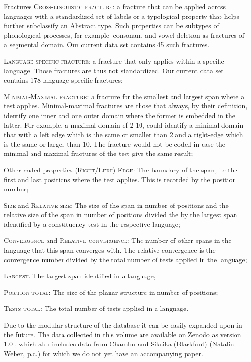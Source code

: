 \documentclass[output=paper,draftmode]{langscibook}
\begin{document}
\ea Fractures
    \ea \textsc{Cross-linguistic fracture}: a fracture that can be applied across languages with a standardized set of labels or a typological property that helps further subclassify an Abstract type. Such properties can be subtypes of phonological processes, for example, consonant and vowel deletion as fractures of a segmental domain. Our current data set contains 45 such fractures.

    \ex \textsc{Language-specific fracture}: a fracture that only applies within a specific language. Those fractures are thus not standardized. Our current data set contains 178 language-specific fractures;

    \ex \textsc{Minimal-Maximal fracture}: a fracture for the smallest and largest span where a test applies. Minimal-maximal fractures are those that always, by their definition, identify one inner and one outer domain where the former is embedded in the latter. For example, a maximal domain of 2-10, could identify a minimal domain that with a left edge which is the same or smaller than 2 and a right-edge which is the same or larger than 10. The fracture would not be coded in case the minimal and maximal fractures of the test give the same result;
    \z
\z

\ea Other coded properties
   \ea \textsc{(Right/Left) Edge}: The boundary of the span, i.e the first and last positions where the test applies. This is recorded by the position number;

    \ex \textsc{Size} and \textsc{Relative size}: The size of the span in number of positions and the relative size of the span in number of positions divided the by the largest span identified by a constituency test in the respective language;

    \ex \textsc{Convergence} and \textsc{Relative convergence}: The number of other spans in the language that this span converges with. The relative convergence is the convergence number divided by the total number of tests applied in the language;

    \ex \textsc{Largest}: The largest span identified in a language;

    \ex \textsc{Position total}: The size of the planar structure in number of positions;

   \ex  \textsc{Tests total}: The total number of tests applied in a language.
    \z
\z

Due to the modular structure of the database it can be easily expanded upon in the future. The data collected in this volume are available on Zenodo as version 1.0 \citep{auderset2023constituency}, which also includes data from Chacobo \citep{tallman2021constituency} and Siksika (Blackfoot) (Natalie Weber, p.c.) for which we do not yet have an accompanying paper.
\end{document}
